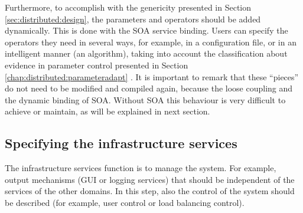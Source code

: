   Furthermore, to accomplish with the genericity presented in Section \ref{sec:distributed:design}, the parameters and operators should be added dynamically. This is done with the SOA service binding. Users can specify the operators they need in several ways, for example, in a configuration file, or in an intelligent manner (an algorithm), taking into account the classification about evidence in parameter control presented in Section \ref{chap:distributed:parameteradapt} . It is important to remark that these ``pieces'' do not need to be modified and compiled again, because the loose coupling and the dynamic binding of SOA. Without SOA this behaviour is very difficult to achieve or maintain, as will be explained in next section.

\subsection{Specifying the infrastructure services}
The infrastructure services function is to manage the system. For example, output mechanisms (GUI or logging services) that should be independent of the services of the other domains. In this step, also the control of the system should be described (for example, user control or load balancing control).












